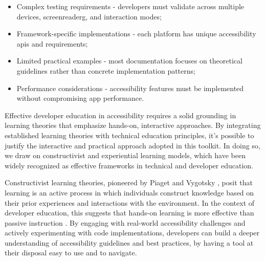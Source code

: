 \begin{itemize}
    \item Complex testing requirements - developers must validate across multiple devices, \gls{screenreaderg}, and interaction modes;
    
    \item Framework-specific implementations - each platform has unique accessibility \acrshort{api}s and requirements;
    
    \item Limited practical examples - most documentation focuses on theoretical guidelines rather than concrete implementation patterns;
    
    \item Performance considerations - accessibility features must be implemented without compromising app performance.
\end{itemize}

Effective developer education in accessibility requires a solid grounding in learning theories that emphasize hands-on, interactive approaches. By integrating established learning theories with technical education principles, it's possible to justify the interactive and practical approach adopted in this toolkit. In doing so, we draw on constructivist and experiential learning models, which have been widely recognized as effective frameworks in technical and developer education.

Constructivist learning theories, pioneered by Piaget \cite{piaget1970science} and Vygotsky \cite{vygotsky1978mind}, posit that learning is an active process in which individuals construct knowledge based on their prior experiences and interactions with the environment. In the context of developer education, this suggests that hands-on learning is more effective than passive instruction \cite{savery2006overview}. By engaging with real-world accessibility challenges and actively experimenting with code implementations, developers can build a deeper understanding of accessibility guidelines and best practices, by having a tool at their disposal easy to use and to navigate. \\

